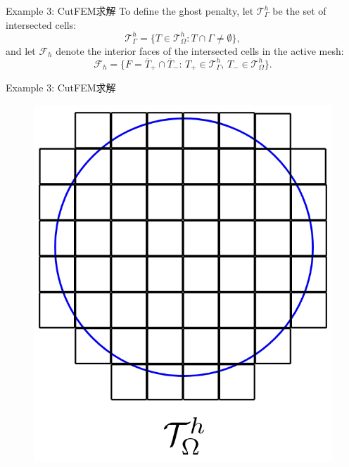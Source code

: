 \documentclass[lang=en,aspectratio=43,theme=default,logo=on]{simplebeamer}
\begin{document}
\begin{frame}{Example 3: CutFEM求解}
To define the ghost penalty, let $\mathcal{T}_\Gamma^h$ be the set of intersected cells:
\begin{equation*}
    \mathcal{T}_{\Gamma}^h = \{ T \in \mathcal{T}_{\Omega}^{h} : T \cap \Gamma \neq \emptyset \},
\end{equation*}
and let $\mathcal{F}_h$ denote the interior faces of the intersected cells in the active mesh:
\begin{equation*}
    \mathcal{F}_h = \{ F = \overline{T}_+ \cap \overline{T}_- : \,
    T_+ \in \mathcal{T}_{\Gamma}^h, \,
    T_- \in \mathcal{T}_{\Omega}^h
    \}.
\end{equation*}
\end{frame}

\begin{frame}{Example 3: CutFEM求解}
    \begin{figure}
        \centering %
        \begin{minipage}[t]{0.5\linewidth}
            \centering
            \includegraphics[height=0.6\textheight]{./img/020.png}
        \end{minipage}%

\end{figure}
\end{frame}
\end{document}
